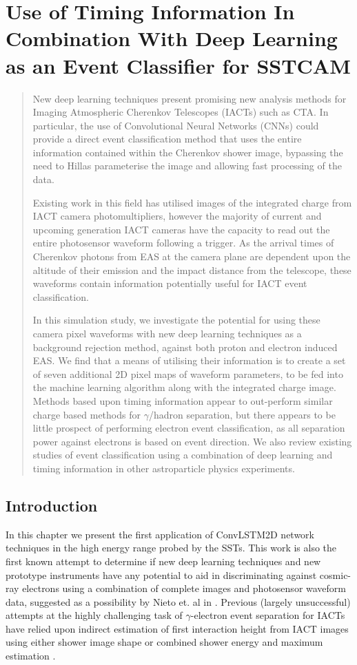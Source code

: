 \chapter{\label{ch:3-TimingInfo} Use of Timing Information In Combination With Deep Learning as an Event Classifier for SSTCAM}
\minitoc
\begin{abstract}
New deep learning techniques present promising new analysis methods for Imaging Atmospheric Cherenkov Telescopes (IACTs) such as CTA. In particular, the use of Convolutional Neural Networks (CNNs) could provide a direct event classification method that uses the entire information contained within the Cherenkov shower image, bypassing the need to Hillas parameterise the image and allowing fast processing of the data. 

Existing work in this field has utilised images of the integrated charge from IACT camera photomultipliers, however the majority of current and upcoming generation IACT cameras have the capacity to read out the entire photosensor waveform following a trigger. As the arrival times of Cherenkov photons from EAS at the camera plane are dependent upon the altitude of their emission and the impact distance from the telescope, these waveforms contain information potentially useful for IACT event classification. 

In this simulation study, we investigate the potential for using these camera pixel waveforms with new deep learning techniques as a background rejection method, against both proton and electron induced EAS. We find that a means of utilising their information is to create a set of seven additional 2D pixel maps of waveform parameters, to be fed into the machine learning algorithm along with the integrated charge image. Methods based upon timing information appear to out-perform similar charge based methods for $\gamma$/hadron separation, but there appears to be little prospect of performing electron event classification, as all separation power against electrons is based on event direction. We also review existing studies of event classification using a combination of deep learning and timing information in other astroparticle physics experiments.
\end{abstract}
\section{Introduction} \label{Introduction}

In this chapter we present the first application of ConvLSTM2D network techniques in the high energy range probed by the SSTs. This work is also the first known attempt to determine if new deep learning techniques and new prototype instruments have any potential to aid in discriminating against cosmic-ray electrons using a combination of complete images and photosensor waveform data, suggested as a possibility by Nieto et. al in \cite{nieto2017exploring}. Previous (largely unsuccessful) attempts at the highly challenging task of $\gamma$-electron event separation for IACTs have relied upon indirect estimation of first interaction height from IACT images using either shower image shape or combined shower energy and maximum estimation \cite{Sitarek1i}.

